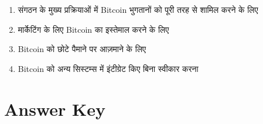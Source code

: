 \documentclass[12pt,a4paper]{article}
\begin{document}
\begin{enumerate}[label=\Alph*., leftmargin=*]
\item संगठन के मुख्य प्रक्रियाओं में Bitcoin भुगतानों को पूरी तरह से शामिल करने के लिए
\item मार्केटिंग के लिए Bitcoin का इस्तेमाल करने के लिए
\item Bitcoin को छोटे पैमाने पर आज़माने के लिए
\item Bitcoin को अन्य सिस्टम्स में इंटीग्रेट किए बिना स्वीकार करना
\end{enumerate}

\bigskip


\newpage
\section*{Answer Key}
\end{document}
